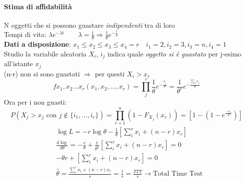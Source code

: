 \documentclass[]{article}
\begin{document}
    \paragraph{Stima di affidabilità} N oggetti che si possono guastare \textit{indipendenti} tra di loro \\
    Tempi di vita: $\lambda e^{-\lambda t} \qquad \lambda = \frac{1}{\theta} \Rightarrow \frac{1}{\theta} e^{-\frac{t}{\theta}}$ \\[2ex]
    \textbf{Dati a disposizione}: $x_1 \leq x_2 \leq x_3 \leq x_4 = r \quad i_1 = 2, i_2 = 3, i_3 = n, i_4 = 1$ \\[2ex]
    Studio la variabile aleatoria $X_i$, $i_j$ indica quale \textit{oggetto si è guastato} per j-esimo all'istante $x_j$ \\[3ex]
    (n-r) non si sono guastati $\Rightarrow$ per questi $X_i > x_r$
    \[ f x_1, x_2 \ldots x_r (x_1, x_2, \ldots, x_r) = \prod_{j}^{r} \frac{1}{\theta} e^{-\frac{x_j}{\theta}} = \frac{1}{\theta^r} e^{-\frac{\sum_{j}^{} x_j}{\theta}}\]
    Ora per i non guasti:
    \[ P\left(X_j > x_j \text{ con } j \not \in \{ i_1, \ldots, i_r \}\right) = \prod_{r+1}^{n} (1-F_{X_j} (x_r)) = \left[ 1- (1- e^{\frac{-x_r}{\theta}}) \right] \]
    \begin{equation*}
        \begin{aligned}
            & \log L = -r \log\theta - \frac{1}{\theta} \left[\sum_{i}^{r} x_i + (n-r) x_r \right] \\
            & \frac{d \log}{d \theta} = - \frac{r}{\theta} + \frac{1}{\theta^2} \left[ \sum_{i}^{r} x_i + (n-r) x_r \right] = 0 \\
            & -\theta r + \left[ \sum_{i}^{r} x_i + (n-r) x_r \right] = 0 \\
            & \hat{\theta} = \frac{\sum_{i}^{r} x_i + (n-r) x_r}{r} = \frac{t}{r} = \frac{TTT}{r} \rightarrow \text{Total Time Test}
        \end{aligned}
    \end{equation*}
\end{document}
